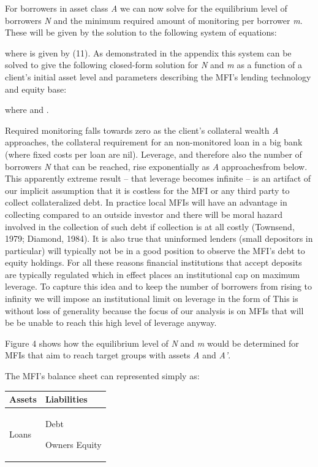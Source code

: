 \documentclass{article}
\begin{document}
For borrowers in asset class \emph{A} we can now solve for the
equilibrium level of borrowers \emph{N} and the minimum required amount
of monitoring per borrower \emph{m}. These will be given by the solution
to the following system of equations:

where is given by (11). As demonstrated in the appendix this system can
be solved to give the following closed-form solution for \emph{N} and
\emph{m} as a function of a client's initial asset level and parameters
describing the MFI's lending technology and equity base:

where and .

Required monitoring falls towards zero as the client's collateral wealth
\emph{A} approaches, the collateral requirement for an non-monitored
loan in a big bank (where fixed costs per loan are nil). Leverage, and
therefore also the number of borrowers \emph{N} that can be reached,
rise exponentially as \emph{A} approachesfrom below. This apparently
extreme result -- that leverage becomes infinite -- is an artifact of
our implicit assumption that it is costless for the MFI or any third
party to collect collateralized debt. In practice local MFIs will have
an advantage in collecting compared to an outside investor and there
will be moral hazard involved in the collection of such debt if
collection is at all costly (Townsend, 1979; Diamond, 1984). It is also
true that uninformed lenders (small depositors in particular) will
typically not be in a good position to observe the MFI's debt to equity
holdings. For all these reasons financial institutions that accept
deposits are typically regulated which in effect places an institutional
cap on maximum leverage. To capture this idea and to keep the number of
borrowers from rising to infinity we will impose an institutional limit
on leverage in the form of This is without loss of generality because
the focus of our analysis is on MFIs that will be be unable to reach
this high level of leverage anyway.

Figure 4 shows how the equilibrium level of \emph{N} and \emph{m} would
be determined for MFIs that aim to reach target groups with assets
\emph{A} and \emph{A'}.

The MFI's balance sheet can represented simply as:

\begin{longtable}[c]{@{}ll@{}}
\toprule
\textbf{Assets} & \textbf{Liabilities}\tabularnewline
\midrule
\endhead
Loans & Debt

Owners Equity\tabularnewline
\bottomrule
\end{longtable}
\end{document}
